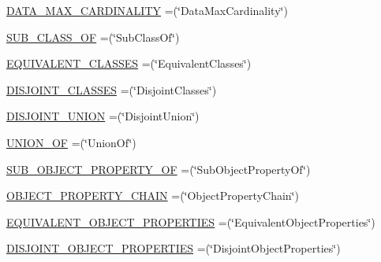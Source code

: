 \begin{DoxyCompactItemize}
\item 
\hyperlink{enumorg_1_1semanticweb_1_1owlapi_1_1vocab_1_1_o_w_l_x_m_l_vocabulary_a223a6e7162f15bc1ab0fc97973923d4f}{D\-A\-T\-A\-\_\-\-M\-A\-X\-\_\-\-C\-A\-R\-D\-I\-N\-A\-L\-I\-T\-Y} =(\char`\"{}Data\-Max\-Cardinality\char`\"{})
\item 
\hyperlink{enumorg_1_1semanticweb_1_1owlapi_1_1vocab_1_1_o_w_l_x_m_l_vocabulary_a0694d5e34f6973a651922f6622630240}{S\-U\-B\-\_\-\-C\-L\-A\-S\-S\-\_\-\-O\-F} =(\char`\"{}Sub\-Class\-Of\char`\"{})
\item 
\hyperlink{enumorg_1_1semanticweb_1_1owlapi_1_1vocab_1_1_o_w_l_x_m_l_vocabulary_a6cff003cc8ffa3e19fd08290fb3120ad}{E\-Q\-U\-I\-V\-A\-L\-E\-N\-T\-\_\-\-C\-L\-A\-S\-S\-E\-S} =(\char`\"{}Equivalent\-Classes\char`\"{})
\item 
\hyperlink{enumorg_1_1semanticweb_1_1owlapi_1_1vocab_1_1_o_w_l_x_m_l_vocabulary_a439fd4a1d049d26deeb4379ed5b5b6c6}{D\-I\-S\-J\-O\-I\-N\-T\-\_\-\-C\-L\-A\-S\-S\-E\-S} =(\char`\"{}Disjoint\-Classes\char`\"{})
\item 
\hyperlink{enumorg_1_1semanticweb_1_1owlapi_1_1vocab_1_1_o_w_l_x_m_l_vocabulary_a3a2315c6f968a223d926a7b032b1c904}{D\-I\-S\-J\-O\-I\-N\-T\-\_\-\-U\-N\-I\-O\-N} =(\char`\"{}Disjoint\-Union\char`\"{})
\item 
\hyperlink{enumorg_1_1semanticweb_1_1owlapi_1_1vocab_1_1_o_w_l_x_m_l_vocabulary_a9e813d334c3796854cce374a694f6426}{U\-N\-I\-O\-N\-\_\-\-O\-F} =(\char`\"{}Union\-Of\char`\"{})
\item 
\hyperlink{enumorg_1_1semanticweb_1_1owlapi_1_1vocab_1_1_o_w_l_x_m_l_vocabulary_ac80122712d06a8a4b1cb37ea2b11877b}{S\-U\-B\-\_\-\-O\-B\-J\-E\-C\-T\-\_\-\-P\-R\-O\-P\-E\-R\-T\-Y\-\_\-\-O\-F} =(\char`\"{}Sub\-Object\-Property\-Of\char`\"{})
\item 
\hyperlink{enumorg_1_1semanticweb_1_1owlapi_1_1vocab_1_1_o_w_l_x_m_l_vocabulary_ae9620ea9355234a766c095370a26fe62}{O\-B\-J\-E\-C\-T\-\_\-\-P\-R\-O\-P\-E\-R\-T\-Y\-\_\-\-C\-H\-A\-I\-N} =(\char`\"{}Object\-Property\-Chain\char`\"{})
\item 
\hyperlink{enumorg_1_1semanticweb_1_1owlapi_1_1vocab_1_1_o_w_l_x_m_l_vocabulary_a24c3981e3a5b4a4b6c650d656299061d}{E\-Q\-U\-I\-V\-A\-L\-E\-N\-T\-\_\-\-O\-B\-J\-E\-C\-T\-\_\-\-P\-R\-O\-P\-E\-R\-T\-I\-E\-S} =(\char`\"{}Equivalent\-Object\-Properties\char`\"{})
\item 
\hyperlink{enumorg_1_1semanticweb_1_1owlapi_1_1vocab_1_1_o_w_l_x_m_l_vocabulary_a5c62702d85e31a7980f325636c7895e4}{D\-I\-S\-J\-O\-I\-N\-T\-\_\-\-O\-B\-J\-E\-C\-T\-\_\-\-P\-R\-O\-P\-E\-R\-T\-I\-E\-S} =(\char`\"{}Disjoint\-Object\-Properties\char`\"{})

\end{DoxyCompactItemize}
